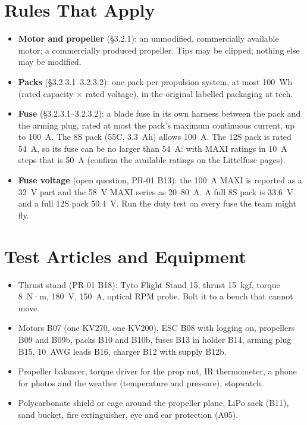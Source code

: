\documentclass[final]{dbfdoc}
\begin{document}
\section{Rules That Apply}
\begin{itemize}
\item \textbf{Motor and propeller} (§3.2.1): an unmodified, commercially available motor; a commercially produced propeller. Tips may be clipped; nothing else may be modified.
\item \textbf{Packs} (§3.2.3.1--3.2.3.2): one pack per propulsion system, at most 100~Wh (rated capacity $\times$ rated voltage), in the original labelled packaging at tech.
\item \textbf{Fuse} (§3.2.3.1--3.2.3.2): a blade fuse in its own harness between the pack and the arming plug, rated at most the pack's maximum continuous current, up to 100~A. The 8S pack (55C, 3.3~Ah) allows 100~A. The 12S pack is rated 54~A, so its fuse can be no larger than 54~A: with MAXI ratings in 10~A steps that is 50~A (confirm the available ratings on the Littelfuse pages).
\item \textbf{Fuse voltage} (open question, PR-01 B13): the 100~A MAXI is reported as a 32~V part and the 58~V MAXI series as 20--80~A. A full 8S pack is 33.6~V and a full 12S pack 50.4~V. Run the duty test on every fuse the team might fly.
\end{itemize}

\section{Test Articles and Equipment}
\begin{itemize}
\item Thrust stand (PR-01 B18): Tyto Flight Stand 15, thrust 15~kgf, torque 8~N·m, 180~V, 150~A, optical RPM probe. Bolt it to a bench that cannot move.
\item Motors B07 (one KV270, one KV200), ESC B08 with logging on, propellers B09 and B09b, packs B10 and B10b, fuses B13 in holder B14, arming plug B15, 10~AWG leads B16, charger B12 with supply B12b.
\item Propeller balancer, torque driver for the prop nut, IR thermometer, a phone for photos and the weather (temperature and pressure), stopwatch.
\item Polycarbonate shield or cage around the propeller plane, LiPo sack (B11), sand bucket, fire extinguisher, eye and ear protection (A05).
\end{itemize}
\end{document}
